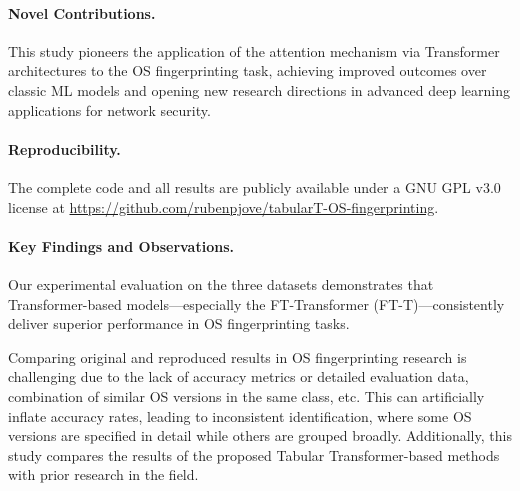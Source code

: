 \paragraph{Novel Contributions.} This study pioneers the application of the attention mechanism via Transformer architectures to the OS fingerprinting task, achieving improved outcomes over classic ML models and opening new research directions in advanced deep learning applications for network security.

\paragraph{Reproducibility.} The complete code and all results are publicly available under a GNU GPL v3.0 license at \url{https://github.com/rubenpjove/tabularT-OS-fingerprinting}.

\paragraph{Key Findings and Observations.} Our experimental evaluation on the three datasets demonstrates that Transformer-based models—especially the FT-Transformer (FT-T)—consistently deliver superior performance in OS fingerprinting tasks.

Comparing original and reproduced results in OS fingerprinting research is challenging due to the lack of accuracy metrics or detailed evaluation data, combination of similar OS versions in the same class, etc. This can artificially inflate accuracy rates, leading to inconsistent identification, where some OS versions are specified in detail while others are grouped broadly. Additionally, this study compares the results of the proposed Tabular Transformer-based methods with prior research in the field.

\clearpage

\vfill

